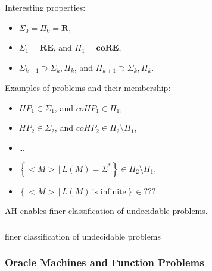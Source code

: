 \documentclass{beamer}
\newcommand{\REcl}{\mathsf{\mathbf{RE}}}
\newcommand{\coREcl}{\mathsf{\mathbf{coRE}}}
\newcommand{\Rcl}{\mathsf{\mathbf{R}}}
\newcommand{\HP}{\mathit{HP}}
\newcommand{\coHP}{\mathit{coHP}}
\newcommand{\st}{\,|\,}
\begin{document}
\begin{frame}
  \frametitle{\insertsubsection}
  Interesting properties:
  \begin{itemize}
    \item  $\Sigma_0 = \Pi_0 = \Rcl$,
    \item  $\Sigma_1 = \REcl$, and $\Pi_1 = \coREcl$,
    \item  $\Sigma_{k+1} \supset \Sigma_k, \Pi_k$, and $\Pi_{k+1} \supset
      \Sigma_k, \Pi_k$.
  \end{itemize}
  \vspace{3mm}
  Examples of problems and their membership:
  \begin{itemize}
    \item  $\HP_1 \in \Sigma_1$, and $\coHP_1 \in \Pi_1$,
    \item  $\HP_2 \in \Sigma_2$, and $\coHP_2 \in \Pi_2 \setminus \Pi_1$,
    \item  \dots
    \item  $\left\{<\!M\!>\st L(M) = \Sigma^{*}\right\} \in \Pi_2 \setminus
      \Pi_1$,
    \item  $\left\{<\!M\!>\st L(M)~\mbox{is infinite}\right\} \in ???$.
  \end{itemize}
  \vspace{3mm}
  AH enables finer classification of undecidable problems.
\end{frame}

\begin{frame}
  \frametitle{\insertsubsection}
  finer classification of undecidable problems
\end{frame}

\begin{frame}
  \frametitle{Oracle Machines and Function Problems}
\end{frame}
\end{document}
